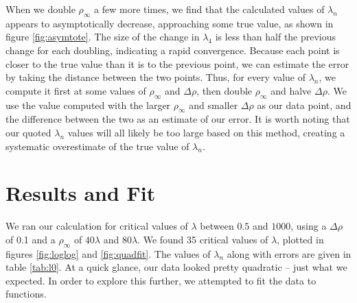 \documentclass[12pt,twoside]{reedthesis}
\begin{document}
When we double $\rho_{\infty}$ a few more times, we find that the calculated values of $\lambda_{n}$ appears to asymptotically decrease, approaching some true value, as shown in figure \ref{fig:asymtote}. The size of the change in $\lambda_4$ is less than half the previous change for each doubling, indicating a rapid convergence. Because each point is closer to the true value than it is to the previous point, we can estimate the error by taking the distance between the two points. Thus, for every value of $\lambda_n$, we compute it first at some values of $\rho_{\infty}$ and $\Delta \rho$, then double $\rho_{\infty}$ and halve $\Delta \rho$. We use the value computed with the larger $\rho_{\infty}$ and smaller $\Delta \rho$ as our data point, and the difference between the two as an estimate of our error.  It is worth noting that our quoted $\lambda_n$ values will all likely be too large based on this method, creating a systematic overestimate of the true value of $\lambda_n$.
 
\section{Results and Fit}
We ran our calculation for critical values of $\lambda$ between $0.5$ and $1000$, using a $\Delta \rho$ of 0.1 and a $\rho_{\infty}$ of $40 \lambda$ and $80 \lambda$. We found 35 critical values of $\lambda$, plotted in figures \ref{fig:loglog} and \ref{fig:quadfit}. The values of $\lambda_n$ along with errors are given in table \ref{tab:l0}. At a quick glance, our data looked pretty quadratic -- just what we expected. In order to explore this further, we attempted to fit the data to functions.
\end{document}

